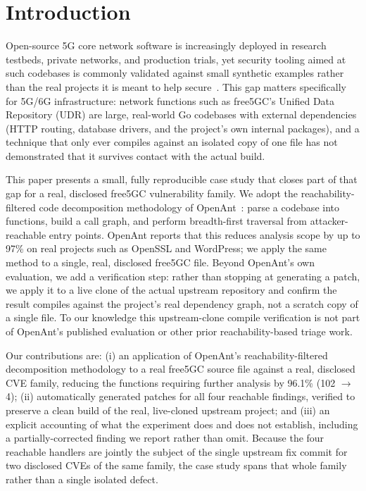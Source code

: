 \documentclass[sigconf]{acmart}
\begin{document}

\maketitle
\sloppy

\section{Introduction}

Open-source 5G core network software is increasingly deployed in research
testbeds, private networks, and production trials, yet security tooling aimed at
such codebases is commonly validated against small synthetic examples rather
than the real projects it is meant to help secure~\cite{kuznetsov,almazyad}.
This gap matters specifically for 5G/6G infrastructure: network functions such
as free5GC's Unified Data Repository (UDR) are large, real-world Go codebases
with external dependencies (HTTP routing, database drivers, and the project's
own internal packages), and a technique that only ever compiles against an
isolated copy of one file has not demonstrated that it survives contact with the
actual build.

This paper presents a small, fully reproducible case study that closes part of
that gap for a real, disclosed free5GC vulnerability family. We adopt the
reachability-filtered code decomposition methodology of OpenAnt~\cite{openant}:
parse a codebase into functions, build a call graph, and perform breadth-first
traversal from attacker-reachable entry points. OpenAnt reports that this
reduces analysis scope by up to 97\% on real projects such as OpenSSL and
WordPress; we apply the same method to a single, real, disclosed free5GC file.
Beyond OpenAnt's own evaluation, we add a verification step: rather than stopping
at generating a patch, we apply it to a live clone of the actual upstream
repository and confirm the result compiles against the project's real dependency
graph, not a scratch copy of a single file. To our knowledge this upstream-clone
compile verification is not part of OpenAnt's published evaluation or other
prior reachability-based triage work.

Our contributions are: (i) an application of OpenAnt's reachability-filtered
decomposition methodology to a real free5GC source file against a real,
disclosed CVE family, reducing the functions requiring further analysis by
96.1\% (102 $\rightarrow$ 4); (ii) automatically generated patches for all four
reachable findings, verified to preserve a clean build of the real, live-cloned
upstream project; and (iii) an explicit accounting of what the experiment does
and does not establish, including a partially-corrected finding we report rather
than omit. Because the four reachable handlers are jointly the subject of the
single upstream fix commit for two disclosed CVEs of the same family, the case
study spans that whole family rather than a single isolated defect.
\end{document}
